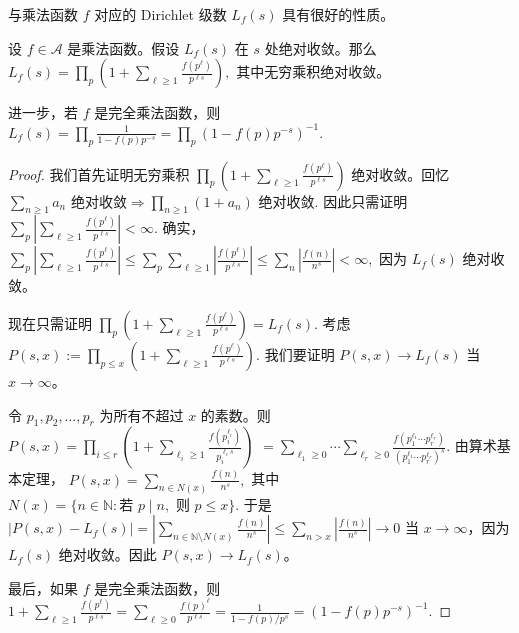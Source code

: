 与乘法函数 $f$ 对应的 Dirichlet 级数 $L_f(s)$ 具有很好的性质。

\begin{theorem}[原文 Theorem 4.7]
	设 $f\in\mathcal A$ 是乘法函数。假设 $L_f(s)$ 在 $s$ 处绝对收敛。那么
	\(\textstyle L_f(s) =\allowbreak{} \prod_p\left(1+\allowbreak{}\sum_{\ell\geq\allowbreak{} 1}\frac{f(p^\ell)}{p^{\ell s}}\right),\allowbreak{}\)
	其中无穷乘积绝对收敛。

	进一步，若 $f$ 是完全乘法函数，则
	\(\textstyle L_f(s) =\allowbreak{} \prod_p\frac1{1-f(p)p^{-s}} =\allowbreak{} \prod_p(1-f(p)p^{-s})^{-1}.\)
\end{theorem}

\begin{proof}
	我们首先证明无穷乘积
	\(\textstyle \prod_p\left(1+\allowbreak{}\sum_{\ell\geq\allowbreak{} 1}\frac{f(p^\ell)}{p^{\ell s}}\right)\)
	绝对收敛。回忆
	\(\textstyle \sum_{n\geq\allowbreak{} 1}a_n\text{ 绝对收敛} \Longrightarrow\allowbreak{} \prod_{n\geq\allowbreak{} 1}(1+\allowbreak{}a_n)\text{ 绝对收敛}.\)
	因此只需证明
	\(\textstyle \sum_p\left|\sum_{\ell\geq\allowbreak{} 1}\frac{f(p^\ell)}{p^{\ell s}}\right|<\infty.\)
	确实，
	\(\textstyle \sum_p\left|\sum_{\ell\geq\allowbreak{} 1}\frac{f(p^\ell)}{p^{\ell s}}\right| \leq\allowbreak{} \sum_p\sum_{\ell\geq\allowbreak{} 1}\left|\frac{f(p^\ell)}{p^{\ell s}}\right| \leq\allowbreak{} \sum_n\left|\frac{f(n)}{n^s}\right| <\infty,\allowbreak{}\)
	因为 $L_f(s)$ 绝对收敛。

	现在只需证明
	\(\textstyle \prod_p\left(1+\allowbreak{}\sum_{\ell\geq\allowbreak{} 1}\frac{f(p^\ell)}{p^{\ell s}}\right) =\allowbreak{} L_f(s).\)
	考虑
	\(\textstyle P(s,\allowbreak{}x):=\allowbreak{} \prod_{p\leq\allowbreak{} x}\left(1+\allowbreak{}\sum_{\ell\geq\allowbreak{} 1}\frac{f(p^\ell)}{p^{\ell s}}\right).\)
	我们要证明 $P(s,x)\to L_f(s)$ 当 $x\to\infty$。

	令 $p_1,p_2,\ldots,p_r$ 为所有不超过 $x$ 的素数。则
	\(\textstyle P(s,\allowbreak{}x) =\allowbreak{} \prod_{i\leq\allowbreak{} r} \left(1+\allowbreak{}\sum_{\ell_i\geq\allowbreak{} 1} \frac{f(p_i^{\ell_i})}{p_i^{\ell_i s}}\right)\) \(\textstyle =\allowbreak{} \sum_{\ell_1\geq\allowbreak{} 0}\cdots\sum_{\ell_r\geq\allowbreak{} 0} \frac{f(p_1^{\ell_1}\cdots p_r^{\ell_r})} {(p_1^{\ell_1}\cdots p_r^{\ell_r})^s}.\)
	由算术基本定理，
	\(\textstyle P(s,\allowbreak{}x)=\allowbreak{}\sum_{n\in N(x)}\frac{f(n)}{n^s},\allowbreak{}\)
	其中
	\(\textstyle N(x)=\allowbreak{}\{n\in\mathbb N:\text{若 }p\mid\allowbreak{} n,\allowbreak{}\text{ 则 }p\leq\allowbreak{} x\}.\)
	于是
	\(\textstyle |P(s,\allowbreak{}x)-L_f(s)| =\allowbreak{} \left| \sum_{n\in\mathbb N\setminus N(x)} \frac{f(n)}{n^s} \right| \leq\allowbreak{} \sum_{n>x}\left|\frac{f(n)}{n^s}\right| \to\allowbreak{} 0\)
	当 $x\to\infty$，因为 $L_f(s)$ 绝对收敛。因此 $P(s,x)\to L_f(s)$。

	最后，如果 $f$ 是完全乘法函数，则
	\(\textstyle 1+\allowbreak{}\sum_{\ell\geq\allowbreak{} 1}\frac{f(p^\ell)}{p^{\ell s}} =\allowbreak{} \sum_{\ell\geq\allowbreak{} 0}\frac{f(p)^\ell}{p^{\ell s}} =\allowbreak{} \frac1{1-f(p)/p^s} =\allowbreak{} (1-f(p)p^{-s})^{-1}.\)
\end{proof}


